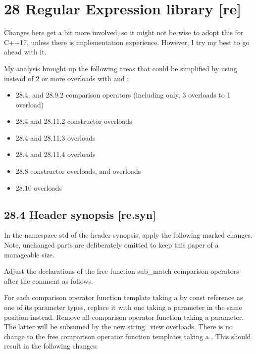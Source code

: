 \documentclass[ebook,11pt,article]{memoir}
\begin{document}
\section{ 28 Regular Expression library  [re]}%
Changes here get a bit more involved, so it might not be wise to adopt this for C++17, unless there is implementation experience. However, I try my best to go ahead with it. 

My analysis brought up the following areas that could be simplified by using  instead of 2 or more overloads with  and :
\begin{itemize}
\item 28.4. and 28.9.2  comparison operators (including  only, 3 overloads to 1 overload)
\item 28.4 and 28.11.2  constructor overloads
\item 28.4 and 28.11.3  overloads
\item 28.4 and 28.11.4  overloads
\item 28.8  constructor overloads,  and  overloads
\item 28.10  overloads
\end{itemize}


\subsection{28.4 Header  synopsis [re.syn]}
In the namespace std of the header synopsis, apply the following marked changes. Note, unchanged parts are deliberately omitted to keep this paper of a manageable size.

Adjust the declarations of the free function sub_match comparison operators after the comment  as follows.

For each comparison operator function template taking a  by const reference as one of its parameter types, replace it with one taking a  parameter in the same position instead. Remove all comparison operator function taking a  parameter. The latter will be subsumed by the new string_view overloads. There is no change to the free comparison operator function templates taking a . This should result in the following changes:
\end{document}

